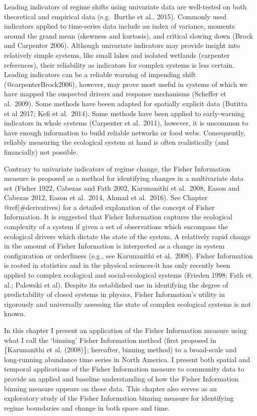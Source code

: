 \documentclass[12pt,twoside]{reedthesis}
\begin{document}
Leading indicators of regime shifts using univariate data are well-tested on both theoretical and empirical data (e.g.~Burthe et al., 2015). Commonly used indicators applied to time-series data include an index of variance, moments around the grand mean (skewness and kurtosis), and critical slowing down (Brock and Carpenter 2006). Although univariate indicators may provide insight into relatively simple systems, like small lakes and isolated wetlands (carpenter references), their reliability as indicators for complex systems is less certain. Leading indicators can be a reliable warning of impending shift (@carpenterBrock2006), however, may prove most useful in systems of which we have mapped the suspected drivers and response mechanisms (Scheffer et al.~2009). Some methods have beeen adapted for spatially explicit data (Butitta et al 2017; Kefi et al.~2014). Some methods have been applied to early-warning indicators in whole systems (Carpenter et al.~2011), however, it is uncommon to have enough information to build reliable networks or food webs. Consequently, reliably measuring the ecological system at hand is often realistically (and financially) not possible.

Contrary to univariate indicators of regime change, the Fisher Information measure is proposed as a method for identifying changes in a multivariate data set (Fisher 1922, Cabezas and Fath 2002, Karunanithi et al.~2008, Eason and Cabezas 2012, Eason et al.~2014, Ahmad et al.~2016). See Chapter @ref(\#derivatives) for a detailed explanation of the concept of Fisher Information. It is suggested that Fisher Information captures the ecological complexity of a system if given a set of observations which encompass the ecological drivers which dictate the state of the system. A relatively rapid change in the amount of Fisher Information is interpreted as a change in system configuration or orderliness (e.g., see Karunanithi et al.~2008). Fisher Information is rooted in statistics and in the physical sciences-it has only recently been applied to complex ecological and social-ecological systems (Frieden 1998; Fath et al.; Palowski et al). Despite its established use in identifying the degree of predictability of closed systems in physics, Fisher Information's utility in rigorously and universally assessing the state of complex ecological systems is not known.

In this chapter I present an application of the Fisher Information measure using what I call the `binning' Fisher Information method (first proposed in \{Karunanithi et al. (2008)\}; hereafter, binning method) to a broad-scale and long-running abundance time series in North America. I present both spatial and temporal applications of the Fisher Information measure to community data to provide an applied and baseline understanding of how the Fisher Information binning measure appears on these data. This chapter also serves as an exploratory study of the Fisher Information binning measure for identifying regime boundaries and change in both space and time.
\end{document}
